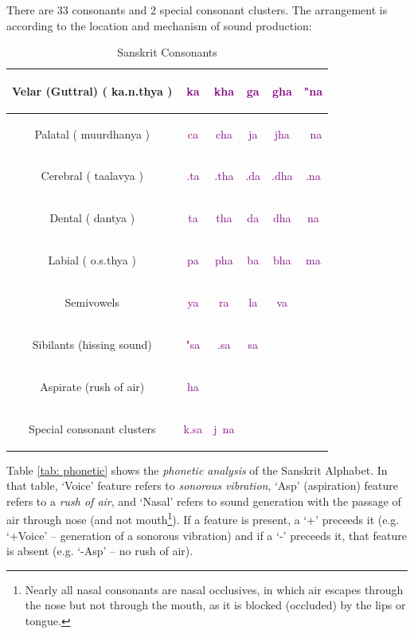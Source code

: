 \documentclass[a4paper, 12pt]{article}
\newcommand \sansletter[1]{
    \fontsize{2cm}{2.4cm}\selectfont
    \sans{#1}
}
\newcommand \sans[1]{
    \textsanskrit{#1}
}
\newcommand \sansconsonant[1]{
    \textcolor{purple} {
    \fontsize{1cm}{1.2cm}\selectfont
    \sans{#1}
    }
}
\begin{document}
There are 33 consonants and 2 special consonant clusters. The arrangement is according to the location and mechanism of sound production:

\begin{table}[hbp]
\begin{center}
    \caption{Sanskrit Consonants}
    \label{tab: consonants}
\begin{tabular}{|c|c|c|c|c|c|}
\hline
    Velar (Guttral) (\sans{ka.n.thya}) &
    \sansconsonant{ka} &
    \sansconsonant{kha} &
    \sansconsonant{ga} &
    \sansconsonant{gha} &
    \sansconsonant{"na} \\
    \hline
    Palatal (\sans{muurdhanya}) &
    \sansconsonant{ca} &
    \sansconsonant{cha} &
    \sansconsonant{ja} &
    \sansconsonant{jha} &
    \sansconsonant{~na} \\
    \hline
    Cerebral (\sans{taalavya}) &
    \sansconsonant{.ta} &
    \sansconsonant{.tha} &
    \sansconsonant{.da} &
    \sansconsonant{.dha} &
    \sansconsonant{.na} \\
    \hline
    Dental (\sans{dantya}) &
    \sansconsonant{ta} &
    \sansconsonant{tha} &
    \sansconsonant{da} &
    \sansconsonant{dha} &
    \sansconsonant{na} \\
    \hline
    Labial (\sans{o.s.thya}) &
    \sansconsonant{pa} &
    \sansconsonant{pha} &
    \sansconsonant{ba} &
    \sansconsonant{bha} &
    \sansconsonant{ma} \\
    \hline
    Semivowels &
    \sansconsonant{ya} &
    \sansconsonant{ra} &
    \sansconsonant{la} &
    \sansconsonant{va} \\
    \hline
    Sibilants (hissing sound) &
    \sansconsonant{"sa} &
    \sansconsonant{.sa} &
    \sansconsonant{sa} \\
    \hline
    Aspirate (rush of air) &
    \sansconsonant{ha} \\
    \hline
    Special consonant clusters &
    \sansconsonant{k.sa} &
    \sansconsonant{j~na}  \\
    \hline
\hline
\end{tabular}
\end{center}
\end{table}


Table \ref{tab: phonetic} shows the \emph{phonetic analysis} of the Sanskrit Alphabet. In that table, `Voice' feature refers to \emph{sonorous vibration}, `Asp' (aspiration) feature refers to a \emph{rush of air}, and `Nasal' refers to sound generation with the passage of air through nose (and not mouth\footnote{Nearly all nasal consonants are nasal occlusives, in which air escapes through the nose but not through the mouth, as it is blocked (occluded) by the lips or tongue.}). If a feature is present, a `+' preceeds it (e.g. `+Voice' -- generation of a sonorous vibration) and if a `-' preceeds it, that feature is absent (e.g. `-Asp' -- no rush of air).
\end{document}

